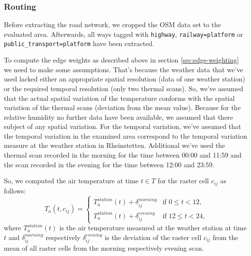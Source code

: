 \subsubsection{Routing}
Before extracting the road network, we cropped the OSM data set to the evaluated area. Afterwards, all ways tagged with \verb|highway|, \verb|railway=platform| or \verb|public_transport=platform| have been extracted.


To compute the edge weights as described above in section \ref{sec:edge-weighting} we need to make some assumptions. That's because the weather data that we've used lacked either an appropriate spatial resolution (data of one weather station)  or the required temporal resolution (only two thermal scans). So, we've assumed that the actual spatial variation of the temperature conforms with the spatial variation of the thermal scans (deviation from the mean value). Because for the relative humidity no further data have been available, we assumed that there subject of any spatial variation. For the temporal variation, we've assumed that the temporal variation in the examined area correspond to the temporal variation measure at the weather station in Rheinstetten.  Additional we've used the thermal scan recorded in the morning for the time between 00:00 and 11:59 and the scan recorded in the evening for the time between 12:00 and 23:59.

So, we computed the air temperature at time $t\in T$ for the raster cell $c_{ij}$ as follows:
\begin{equation}
\label{eq:derived-temperature}
T_a(t, c_{ij}) = \begin{cases}
T_{a}^{station}(t) + \delta_{ij}^{morning} & \text{if $0 \leq t < 12$,}\\
T_{a}^{station}(t) + \delta_{ij}^{evening} & \text{if $12 \leq t < 24$,}
\end{cases}
\end{equation}
where $T_{a}^{station}(t)$ is the air temperature measured at the weather station at time $t$ and $\delta^{morning}_{ij}$ respectively  $\delta^{evening}_{ij}$ is the deviation of the raster cell $c_{ij}$ from the mean of all raster cells from the morning respectively evening scan.


